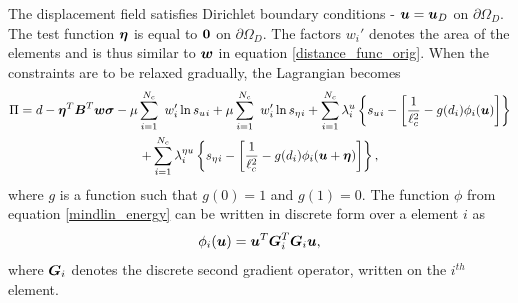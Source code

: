 \documentclass[10pt]{cas-sc}
\begin{document}
The displacement field satisfies Dirichlet boundary conditions - $\mbox{\boldmath $u$} = \mbox{\boldmath $u$}_D$ on $\partial \Omega_D$. The test function $\mbox{\boldmath $\eta$}$ is equal to $\bf0$ on $\partial \Omega_D$. The factors $ w_i'$ denotes the area of the  elements and is thus similar to $ \mbox{\boldmath $w$}$ in equation \eqref{distance_func_orig}. When the constraints are to be relaxed gradually, the Lagrangian becomes
\begin{multline}
	\Pi  = d -\mbox{\boldmath $\eta$} ^T \mbox{\boldmath $B$}^T \mbox{\boldmath $w$} \mbox{\boldmath $\sigma$} - \mu \sum_{i=1}^{N_c} \
	w_i' \ln s_u{_i} + \mu \sum_{i=1}^{N_c} \
	w_i' \ln s_\eta{_i} +\sum_{i=1}^{N_c} \lambda^u_i \left\{ s_u{_i}  - \left[ \frac{1}{\ell_c ^2}- g(d_i)\phi_i(\mbox{\boldmath $u$}) \right]  \right\} \\
	+\sum_{i=1}^{N_c} \lambda^{\eta u}_ i \left\{ s_\eta{_i}  - \left[ \frac{1}{\ell_c ^2}-g(d_i) \phi_i(\mbox{\boldmath $u$}+\mbox{\boldmath $\eta$}) \right]  \right\}, \label{lagrangian_interior_point}
\end{multline}
where $g$ is a function such that $g(0)=1$ and $g(1)=0$. The function $\phi$ from equation \eqref{mindlin_energy} can be written in discrete form over a \added{lip} element $i$ as
\begin{equation}
	\phi_i(\mbox{\boldmath $u$} ) = \mbox{\boldmath $u$} ^T \mbox{\boldmath $G$}_i ^T \mbox{\boldmath $G$}_i \mbox{\boldmath $u$},
\end{equation}
where $\mbox{\boldmath $G$}_i$ denotes the discrete second gradient operator, written on the $i^{th}$  element. 
\end{document}

